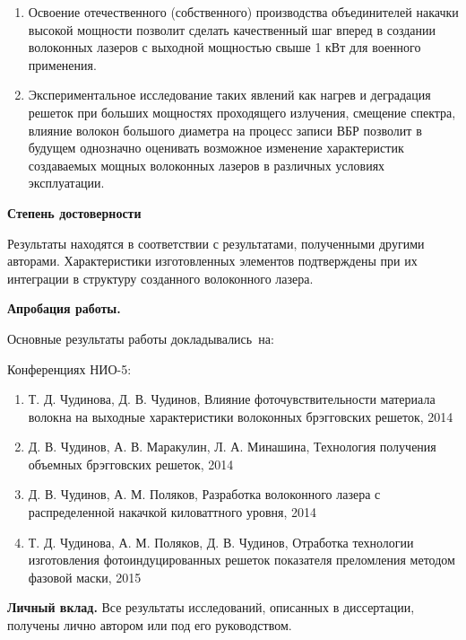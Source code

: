 \begin{enumerate}
  \item Освоение отечественного (собственного) производства объединителей накачки высокой мощности позволит сделать качественный шаг вперед в создании волоконных лазеров с выходной мощностью свыше 1 кВт для военного применения.
  \item Экспериментальное исследование таких явлений как нагрев и деградация решеток при больших мощностях проходящего излучения, смещение спектра, влияние волокон большого диаметра на процесс записи ВБР позволит в будущем однозначно оценивать возможное изменение характеристик создаваемых мощных волоконных лазеров в различных условиях эксплуатации.
\end{enumerate}

\textbf{Степень достоверности}

Результаты находятся в соответствии с результатами, полученными другими авторами. Характеристики изготовленных элементов подтверждены при их интеграции в структуру созданного волоконного лазера.

\textbf{Апробация работы.}

Основные результаты работы докладывались~на:

Конференциях НИО-5:
\begin{enumerate}
  \item Т. Д. Чудинова, Д. В. Чудинов, Влияние фоточувствительности материала волокна на выходные характеристики волоконных брэгговских решеток, 2014
  \item Д. В. Чудинов, А. В. Маракулин, Л. А. Минашина, Технология получения объемных брэгговских решеток, 2014
  \item Д. В. Чудинов, А. М. Поляков, Разработка волоконного лазера с распределенной накачкой киловаттного уровня, 2014
  \item Т. Д. Чудинова, А. М. Поляков, Д. В. Чудинов, Отработка технологии изготовления фотоиндуцированных решеток показателя преломления методом фазовой маски, 2015
\end{enumerate}


\textbf{Личный вклад.} Все результаты исследований, описанных в диссертации, получены лично автором или под его руководством. 


